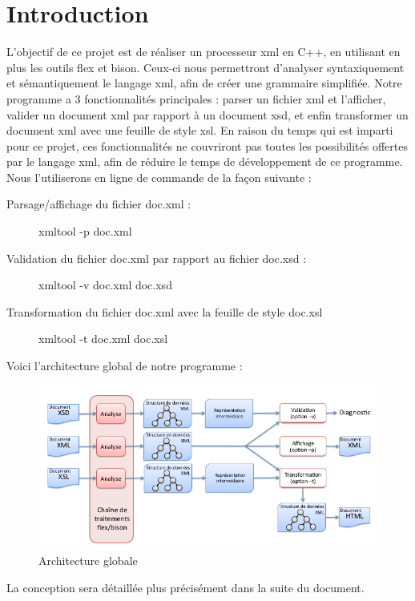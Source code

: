 \chapter{Introduction}

L'objectif de ce projet est de réaliser un processeur xml en C++, en utilisant en plus les outils flex et bison. Ceux-ci nous permettront d'analyser syntaxiquement et sémantiquement le langage xml, afin de créer une grammaire simplifiée. Notre programme a 3 fonctionnalités principales : parser un fichier xml et l'afficher, valider un document xml par rapport à un document xsd, et enfin transformer un document xml avec une feuille de style xsl. En raison du temps qui est imparti pour ce projet, ces fonctionnalités ne couvriront pas toutes les possibilités offertes par le langage xml, afin de réduire le temps de développement de ce programme. \\
Nous l'utiliserons en ligne de commande de la façon suivante :
\begin{description}
    \item[Parsage/affichage du fichier doc.xml :] xmltool -p doc.xml
    \item[Validation du fichier doc.xml par rapport au fichier doc.xsd :] xmltool -v doc.xml doc.xsd
    \item[Transformation du fichier doc.xml avec la feuille de style doc.xsl] xmltool -t doc.xml doc.xsl \\
\end{description}

Voici l'architecture global de notre programme :

    \begin{figure}[h!]
        \centering
        \includegraphics[width=0.8\linewidth]{images/archi.png}
        \caption{Architecture globale}
        \label{classDiagram}
    \end{figure}

La conception sera détaillée plus précisément dans la suite du document.